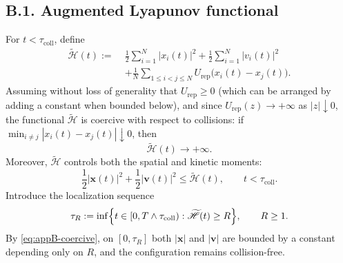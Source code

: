 \documentclass[pdflatex,sn-mathphys-num]{sn-jnl}%
\numberwithin{equation}{section}
\theoremstyle{thmstyleone}%
\theoremstyle{remark}
\theoremstyle{definition}
\begin{document}
\subsection*{B.1. Augmented Lyapunov functional}
For $t<\tau_{\mathrm{coll}}$, define
\begin{equation}\label{eq:appB-Htilde}
\begin{aligned}
  \widetilde{\mathscr H}(t)
  :=\;&
  \frac12\sum_{i=1}^N |x_i(t)|^2
  + \frac12\sum_{i=1}^N |v_i(t)|^2 \\
  &+ \frac1N\sum_{1\le i<j\le N}
    U_{\mathrm{rep}}\bigl(x_i(t)-x_j(t)\bigr).
\end{aligned}
\end{equation}
Assuming without loss of generality that $U_{\mathrm{rep}} \ge 0$ (which
can be arranged by adding a constant when bounded below), and since
$U_{\mathrm{rep}}(z)\to+\infty$ as $|z|\downarrow 0$, the functional
$\widetilde{\mathscr H}$ is coercive with respect to collisions: if
$\min_{i\neq j}|x_i(t)-x_j(t)|\downarrow 0$, then
\[
  \widetilde{\mathscr H}(t)\to+\infty.
\]
Moreover, $\widetilde{\mathscr H}$ controls both the spatial and kinetic
moments:
\begin{equation}\label{eq:appB-coercive}
  \frac12|\mathbf{x}(t)|^2+\frac12|\mathbf{v}(t)|^2
  \le \widetilde{\mathscr H}(t),
  \qquad t<\tau_{\mathrm{coll}}.
\end{equation}
Introduce the localization sequence
\begin{equation}\label{eq:appB-tauR}
\begin{aligned}
  \tau_R
  :=
  \inf\Bigl\{
    t\in[0,T\wedge\tau_{\mathrm{coll}}):
    \widetilde{\mathscr H}(t)\ge R
  \Bigr\},
  \qquad R\ge 1.
\end{aligned}
\end{equation}
By \eqref{eq:appB-coercive}, on $[0,\tau_R]$ both $|\mathbf{x}|$ and $|\mathbf{v}|$
are bounded by a constant depending only on $R$, and the configuration
remains collision-free.
\end{document}
